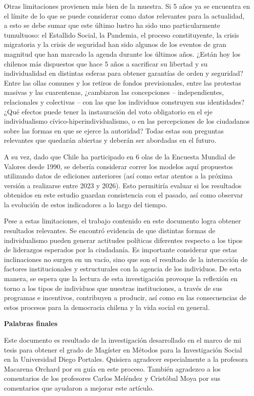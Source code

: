\documentclass[12pt,oneside]{templates/facsothesis}
\begin{document}
Otras limitaciones provienen más bien de la muestra. Si 5 años ya se encuentra en el límite de lo que se puede considerar como datos relevantes para la actualidad, a esto se debe sumar que este último lustro ha sido uno particularmente tumultuoso: el Estallido Social, la Pandemia, el proceso constituyente, la crisis migratoria y la crisis de seguridad han sido algunos de los eventos de gran magnitud que han marcado la agenda durante los últimos años. ¿Están hoy los chilenos más dispuestos que hace 5 años a sacrificar su libertad y su individualidad en distintas esferas para obtener garantías de orden y seguridad? Entre las ollas comunes y los retiros de fondos previsionales, entre las protestas masivas y las cuarentenas, ¿cambiaron las concepciones -- independientes, relacionales y colectivas -- con las que los individuos construyen sus identidades? ¿Qué efectos puede tener la instauración del voto obligatorio en el eje individualismo cívico-hiperindividualismo, o en las percepciones de los ciudadanos sobre las formas en que se ejerce la autoridad? Todas estas son preguntas relevantes que quedarán abiertas y deberán ser abordadas en el futuro.

A su vez, dado que Chile ha participado en 6 olas de la Encuesta Mundial de Valores desde 1990, se debería considerar correr los modelos aquí propuestos utilizando datos de ediciones anteriores (así como estar atentos a la próxima versión a realizarse entre 2023 y 2026). Esto permitiría evaluar si los resultados obtenidos en este estudio guardan consistencia con el pasado, así como observar la evolución de estos indicadores a lo largo del tiempo.

Pese a estas limitaciones, el trabajo contenido en este documento logra obtener resultados relevantes. Se encontró evidencia de que distintas formas de individualismo pueden generar actitudes políticas diferentes respecto a los tipos de liderazgos esperados por la ciudadanía. Es importante considerar que estas inclinaciones no surgen en un vacío, sino que son el resultado de la interacción de factores institucionales y estructurales con la agencia de los individuos. De esta manera, se espera que la lectura de esta investigación provoque la reflexión en torno a los tipos de individuos que nuestras instituciones, a través de sus programas e incentivos, contribuyen a producir, así como en las consecuencias de estos procesos para la democracia chilena y la vida social en general.

\textbf{Palabras finales}

Este documento es resultado de la investigación desarrollado en el marco de mi tesis para obtener el grado de Magíster en Métodos para la Investigación Social en la Universidad Diego Portales. Quisiera agradecer especialmente a la profesora Macarena Orchard por su guía en este proceso. También agradezco a los comentarios de los profesores Carlos Meléndez y Cristóbal Moya por sus comentarios que ayudaron a mejorar este artículo.
\end{document}
